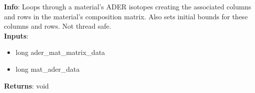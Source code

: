 \textbf{Info}: Loops through a material's ADER isotopes creating the associated
columns and rows in the material's composition matrix. Also sets initial bounds
for these columns and rows. Not thread safe. \\

\noindent \textbf{Inputs}:
\begin{itemize}
\item{long ader\_mat\_matrix\_data}
\item{long mat\_ader\_data}
\end{itemize}

\noindent \textbf{Returns}: void
